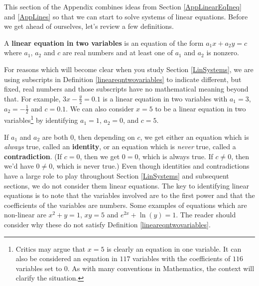 \documentclass{ximera}
\begin{document}
	\author{Stitz-Zeager}




\setcounter{footnote}{0}

\label{AppLinearSystems}

\setlength{\extrarowheight}{0pt}

This section of the Appendix combines ideas from Section \ref{AppLinearEqIneq} and \ref{AppLines} so that we can start to solve systems of linear equations.  Before we get ahead of ourselves, let's review a few definitions.

 


\begin{definition}  \label{lineareqntwovariables}  A \textbf{linear equation in two variables} is an equation of the form $a_1 x + a_2 y = c$ where $a_1$, $a_2$ and $c$ are real numbers and at least one of $a_1$ and $a_2$ is nonzero.

\end{definition}


 

For reasons which will become clear when you study Section \ref{LinSystems}, we are using subscripts in Definition \ref{lineareqntwovariables} to indicate different, but fixed, real numbers and those subscripts have no mathematical meaning beyond that.  For example, $3x - \frac{y}{2} = 0.1$ is a linear equation in two variables with $a_1 = 3$, $a_2 = -\frac{1}{2}$ and $c = 0.1$.  We can also consider $x = 5$ to be a linear equation in two variables\footnote{Critics may argue that $x=5$ is clearly an equation in one variable.  It can also be considered an equation in $117$ variables with the coefficients of $116$ variables set to $0$.  As with many conventions in Mathematics, the context will clarify the situation.} by identifying $a_1 = 1$, $a_2 = 0$, and $c = 5$.  

 

If $a_1$ and $a_2$ are both $0$, then depending on $c$, we get either an equation which is \textit{always} true, called an \textbf{identity}, or an equation which is \textit{never} true, called a \textbf{contradiction}. (If $c = 0$, then we get $0 = 0$, which is always true.  If $c \neq 0$, then we'd have  $0 \neq 0$, which is never true.)  Even though identities and contradictions have a large role to play throughout Section \ref{LinSystems} and subsequent sections, we do not consider them linear equations.  The key to identifying linear equations is to note that the variables involved are to the first power and that the coefficients of the variables are numbers.  Some examples of equations which are non-linear are $x^2 + y = 1$, $xy = 5$ and $e^{2x} + \ln(y) = 1$.  The reader should consider why these do not satisfy Definition \ref{lineareqntwovariables}.  
\end{document}
